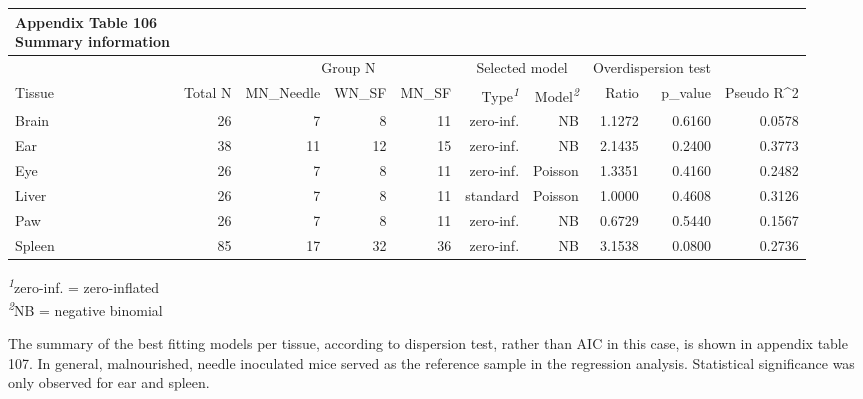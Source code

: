 \documentclass[
  12pt,
  letterpaper,
]{article}
\begin{document}
\begingroup
\fontsize{12.0pt}{14.4pt}\selectfont
\setlength{\LTpost}{0mm}
\begin{longtable}{l|rrrrrrrrr}
\caption*{
{\large \textbf{Appendix Table 106}} \\ 
{\small \textbf{Summary information}}
} \\ 
\toprule
 &  & \multicolumn{3}{c}{Group N} & \multicolumn{2}{c}{Selected model} & \multicolumn{2}{c}{Overdispersion test} &  \\ 
\cmidrule(lr){3-5} \cmidrule(lr){6-7} \cmidrule(lr){8-9}
Tissue & {Total N} & MN\_Needle & WN\_SF & MN\_SF & Type\textsuperscript{\textit{1}} & Model\textsuperscript{\textit{2}} & Ratio & p\_value & Pseudo R\textasciicircum{}2 \\ 
\midrule\addlinespace[2.5pt]
Brain & 26 & 7 & 8 & 11 & zero-inf. & NB & 1.1272 & 0.6160 & 0.0578 \\ 
Ear & 38 & 11 & 12 & 15 & zero-inf. & NB & 2.1435 & 0.2400 & 0.3773 \\ 
Eye & 26 & 7 & 8 & 11 & zero-inf. & Poisson & 1.3351 & 0.4160 & 0.2482 \\ 
Liver & 26 & 7 & 8 & 11 & standard & Poisson & 1.0000 & 0.4608 & 0.3126 \\ 
Paw & 26 & 7 & 8 & 11 & zero-inf. & NB & 0.6729 & 0.5440 & 0.1567 \\ 
Spleen & 85 & 17 & 32 & 36 & zero-inf. & NB & 3.1538 & 0.0800 & 0.2736 \\ 
\bottomrule
\end{longtable}
\begin{minipage}{\linewidth}
\textsuperscript{\textit{1}}zero-inf. = zero-inflated\\
\textsuperscript{\textit{2}}NB = negative binomial\\
\end{minipage}
\endgroup

The summary of the best fitting models per tissue, according to dispersion test, rather than AIC in this case, is shown in appendix table 107. In general, malnourished, needle inoculated mice served as the reference sample in the regression analysis. Statistical significance was only observed for ear and spleen.
\end{document}
